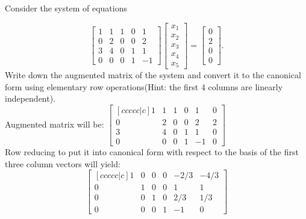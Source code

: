\documentclass[12pt]{extarticle}
\theoremstyle{definition}
\begin{document}
\begin{problem} Consider the system of equations 

	\[\begin{bmatrix}
	1&1&1&0&1\\
	0&2&0&0&2\\
	3&4&0&1&1\\
	0&0&0&1&-1
	\end{bmatrix}\begin{bmatrix}
	x_1\\x_2\\x_3\\x_4\\x_5
	\end{bmatrix}=\begin{bmatrix}
	0\\2\\0\\0
	\end{bmatrix}.\]
	Write down the augmented matrix of the system and convert it to the canonical form using elementary row operations(Hint: the first 4 columns are linearly independent).\\

	Augmented matrix will be:
	$\begin{bmatrix}[ccccc|c]
	1&1&1&0&1&0\\
	0&2&0&0&2&2\\
	3&4&0&1&1&0\\
	0&0&0&1&-1&0
	\end{bmatrix}$\\

	Row reducing to put it into canonical form with respect to the basis of the first three column vectors will yield:
	$$\begin{bmatrix}[ccccc|c]
	1&0&0&0&-2/3&-4/3\\
	0&1&0&0&1&1\\
	0&0&1&0&2/3&1/3\\
	0&0&0&1&-1&0
	\end{bmatrix}$$


\end{problem}


\small


\end{document}
